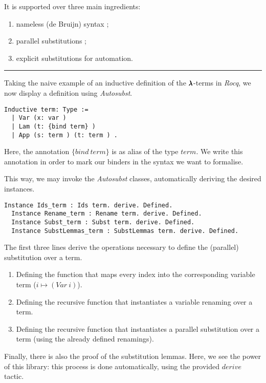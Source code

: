 It is supported over three main ingredients:
\begin{enumerate}
\item nameless (de Bruijn) syntax ;
\item parallel substitutions ;
\item explicit substitutions for automation.
\end{enumerate}

\vspace{2em} \hrule \vspace{2em}

Taking the naive example of an inductive definition of the $\pmb{\lambda}$-terms in \textit{Rocq}, we now display a definition using \textit{Autosubst}.

\begin{lstlisting}[language=Coq]
  Inductive term: Type :=
  | Var (x: var )
  | Lam (t: {bind term} )
  | App (s: term ) (t: term ) .
\end{lstlisting}

Here, the annotation $\{bind \ term\}$ is as alias of the type $term$.
We write this annotation in order to mark our binders in the syntax we want to formalise.  

This way, we may invoke the \textit{Autosubst} classes, automatically deriving the desired instances.

\begin{lstlisting}[language=Coq]
  Instance Ids_term : Ids term. derive. Defined.
  Instance Rename_term : Rename term. derive. Defined.
  Instance Subst_term : Subst term. derive. Defined.
  Instance SubstLemmas_term : SubstLemmas term. derive. Defined.
\end{lstlisting}

The first three lines derive the operations necessary to define the (parallel) substitution over a term.
\begin{enumerate}
\item Defining the function that maps every index into the corresponding variable term ($i \mapsto (Var \ i)$).
\item Defining the recursive function that instantiates a variable renaming over a term.
\item Defining the recursive function that instantiates a parallel substitution over a term (using the already defined renamings).
\end{enumerate}

Finally, there is also the proof of the substitution lemmas. 
Here, we see the power of this library: this process is done automatically, using the provided $derive$ tactic.

